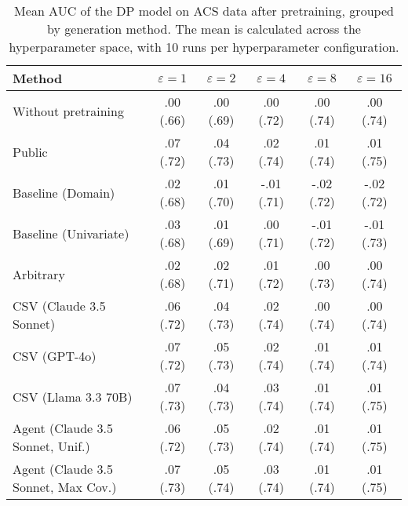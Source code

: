 \begin{table}[h!]
    \centering
    \caption{Mean AUC of the DP model on ACS data after pretraining, grouped by generation method. The mean is calculated across the hyperparameter space, with 10 runs per hyperparameter configuration.}
    \label{tab:epsilon_comparison}
    \begin{tabular}{lccccc}
    \toprule
    Method & $\varepsilon=1$ & $\varepsilon=2$ & $\varepsilon=4$ & $\varepsilon=8$ & $\varepsilon=16$ \\
    \midrule
    Without pretraining & .00 {\small (.66)} & .00 {\small (.69)} & .00 {\small (.72)} & .00 {\small (.74)} & .00 {\small (.74)} \\
    \arrayrulecolor{black!50!}\midrule
    Public & .07 {\small (.72)} & .04 {\small (.73)} & \cellcolor{bronze!30}.02 {\small (.74)} & \cellcolor{silver!30}.01 {\small (.74)} & \cellcolor{bronze!30}.01 {\small (.75)} \\
    \arrayrulecolor{black!50!}\midrule
    Baseline (Domain) & .02 {\small (.68)} & .01 {\small (.70)} & -.01 {\small (.71)} & -.02 {\small (.72)} & -.02 {\small (.72)} \\
    Baseline (Univariate) & .03 {\small (.68)} & .01 {\small (.69)} & .00 {\small (.71)} & -.01 {\small (.72)} & -.01 {\small (.73)} \\
    \arrayrulecolor{black!50!}\midrule
    Arbitrary & .02 {\small (.68)} & .02 {\small (.71)} & .01 {\small (.72)} & .00 {\small (.73)} & .00 {\small (.74)} \\
    \arrayrulecolor{black!50!}\midrule
    CSV (Claude 3.5 Sonnet) & .06 {\small (.72)} & .04 {\small (.73)} & .02 {\small (.74)} & .00 {\small (.74)} & .00 {\small (.74)} \\
    CSV (GPT-4o) & \cellcolor{bronze!30}.07 {\small (.72)} & \cellcolor{silver!30}.05 {\small (.73)} & .02 {\small (.74)} & \cellcolor{silver!30}.01 {\small (.74)} & .01 {\small (.74)} \\
    CSV (Llama 3.3 70B) & \cellcolor{silver!30}.07 {\small (.73)} & .04 {\small (.73)} & \cellcolor{silver!30}.03 {\small (.74)} & \cellcolor{bronze!30}.01 {\small (.74)} & \cellcolor{silver!30}.01 {\small (.75)} \\
    \arrayrulecolor{black!50!}\midrule
    Agent (Claude 3.5 Sonnet, Unif.) & .06 {\small (.72)} & \cellcolor{bronze!30}.05 {\small (.73)} & .02 {\small (.74)} & \cellcolor{silver!30}.01 {\small (.74)} & \cellcolor{silver!30}.01 {\small (.75)} \\
    Agent (Claude 3.5 Sonnet, Max Cov.) & \cellcolor{gold!30}.07 {\small (.73)} & \cellcolor{gold!30}.05 {\small (.74)} & \cellcolor{gold!30}.03 {\small (.74)} & \cellcolor{gold!30}.01 {\small (.74)} & \cellcolor{gold!30}.01 {\small (.75)} \\

\end{tabular}
\end{table}
